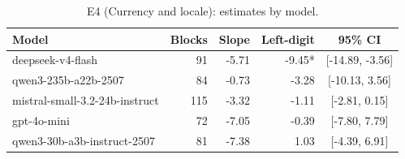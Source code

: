 \begin{table}[t]
\centering
\caption{E4 (Currency and locale): estimates by model.}
\label{tab:e4model}
\small
\begin{tabular}{lrrrc}
\toprule
Model & Blocks & Slope & Left-digit & 95\% CI \\
\midrule
deepseek-v4-flash &  91 & -5.71 & -9.45* & [-14.89, -3.56] \\
qwen3-235b-a22b-2507 &  84 & -0.73 & -3.28 & [-10.13, 3.56] \\
mistral-small-3.2-24b-instruct & 115 & -3.32 & -1.11 & [-2.81, 0.15] \\
gpt-4o-mini &  72 & -7.05 & -0.39 & [-7.80, 7.79] \\
qwen3-30b-a3b-instruct-2507 &  81 & -7.38 & 1.03 & [-4.39, 6.91] \\
\bottomrule
\end{tabular}
\end{table}
